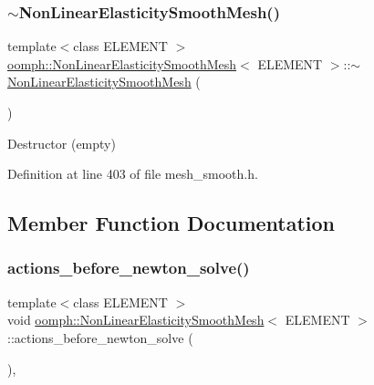 \subsubsection{\texorpdfstring{$\sim$\+Non\+Linear\+Elasticity\+Smooth\+Mesh()}{~NonLinearElasticitySmoothMesh()}}
{\footnotesize\ttfamily template$<$class E\+L\+E\+M\+E\+NT $>$ \\
\hyperlink{classoomph_1_1NonLinearElasticitySmoothMesh}{oomph\+::\+Non\+Linear\+Elasticity\+Smooth\+Mesh}$<$ E\+L\+E\+M\+E\+NT $>$\+::$\sim$\hyperlink{classoomph_1_1NonLinearElasticitySmoothMesh}{Non\+Linear\+Elasticity\+Smooth\+Mesh} (\begin{DoxyParamCaption}{ }\end{DoxyParamCaption})\hspace{0.3cm}{\ttfamily [inline]}}



Destructor (empty) 



Definition at line 403 of file mesh\+\_\+smooth.\+h.



\subsection{Member Function Documentation}
\mbox{\label{classoomph_1_1NonLinearElasticitySmoothMesh_a778763122903088b5234fcf7ca35a0b5}} 
\subsubsection{\texorpdfstring{actions\+\_\+before\+\_\+newton\+\_\+solve()}{actions\_before\_newton\_solve()}}
{\footnotesize\ttfamily template$<$class E\+L\+E\+M\+E\+NT $>$ \\
void \hyperlink{classoomph_1_1NonLinearElasticitySmoothMesh}{oomph\+::\+Non\+Linear\+Elasticity\+Smooth\+Mesh}$<$ E\+L\+E\+M\+E\+NT $>$\+::actions\+\_\+before\+\_\+newton\+\_\+solve (\begin{DoxyParamCaption}{ }\end{DoxyParamCaption})\hspace{0.3cm}{\ttfamily [inline]}, {\ttfamily [virtual]}}



